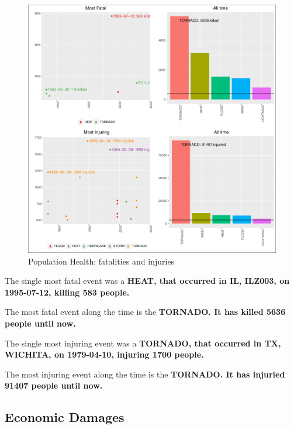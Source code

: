 \documentclass[]{article}
\begin{document}
\begin{figure}[h!]
\centering
\includegraphics{readme_files/figure-latex/health-plot-1.pdf}
\caption{Population Health: fatalities and injuries}
\end{figure}

The single most fatal event was a \textbf{HEAT, that occurred in IL,
ILZ003, on 1995-07-12, killing 583 people.}

The most fatal event along the time is the \textbf{TORNADO. It has
killed 5636 people until now.}

The single most injuring event was a \textbf{TORNADO, that occurred in
TX, WICHITA, on 1979-04-10, injuring 1700 people.}

The most injuring event along the time is the \textbf{TORNADO. It has
injuried 91407 people until now.}

\subsection{Economic Damages}\label{economic-damages}
\end{document}
